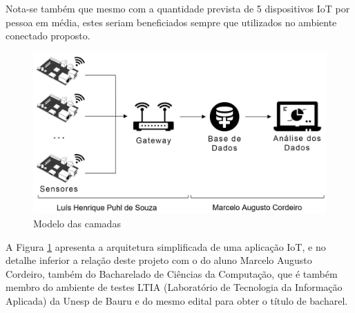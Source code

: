 Nota-se também que mesmo com a quantidade prevista de 5 dispositivos IoT por
pessoa em média, estes seriam beneficiados sempre que utilizados no ambiente
conectado proposto.

\begin{figure}[htb]
	\caption{\label{fig:projeto}Modelo das camadas }
	\begin{center}
		\includegraphics[width=1\textwidth]{012-justificativa/img/projeto.jpg}
	\end{center}
\end{figure}

A Figura \ref{fig:projeto} apresenta a arquitetura simplificada de uma aplicação
IoT, e no detalhe inferior a relação deste projeto com o do aluno Marcelo Augusto
Cordeiro, também do Bacharelado de Ciências da Computação, que é também membro do
ambiente de testes LTIA (Laboratório de Tecnologia da Informação Aplicada) da Unesp de Bauru
e do mesmo edital para obter o título de bacharel.
